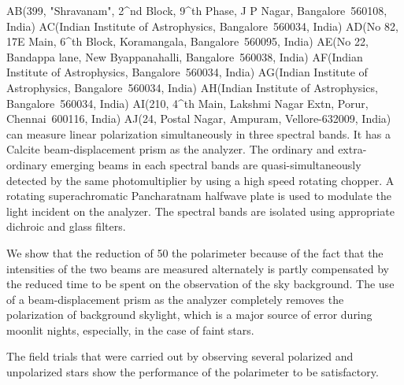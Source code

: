 {{{{{{{{{{{{{%
AB(399, "Shravanam", 2^{nd} Block, 9^{th} Phase, J P Nagar, Bangalore~560108, India)
AC(Indian Institute of Astrophysics, Bangalore~560034, India)
AD(No 82, 17E Main, 6^{th} Block, Koramangala, Bangalore~560095, India)
AE(No 22, Bandappa lane, New Byappanahalli, Bangalore~560038, India)
AF(Indian Institute of Astrophysics, Bangalore~560034, India)
AG(Indian Institute of Astrophysics, Bangalore~560034, India)
AH(Indian Institute of Astrophysics, Bangalore~560034, India)
AI(210, 4^{th} Main, Lakshmi Nagar Extn, Porur, Chennai~600116, India)
AJ(24, Postal Nagar, Ampuram, Vellore-632009, India)
can measure linear polarization simultaneously in three spectral bands.
It has a Calcite beam-displacement prism as the analyzer. The ordinary
and extra-ordinary emerging beams in each spectral bands are
quasi-simultaneously detected by the same photomultiplier by using a high speed
rotating chopper.
 A rotating superachromatic Pancharatnam halfwave
plate is used to modulate the light incident on the analyzer. The spectral
bands are isolated using appropriate dichroic and glass filters.

 We show that the reduction of 50%
 the polarimeter because of the fact that the intensities of the two beams
are measured alternately is partly compensated by the reduced time to be
spent on the observation of the sky background. The use of a beam-displacement
 prism as the analyzer completely removes the polarization of
background skylight, which
is a major source of error during moonlit nights, especially, in
the case of faint stars.

The field trials that were carried out by observing several
polarized and unpolarized stars show the performance of the polarimeter
to be satisfactory.




}}}}}}}}}}}}}
